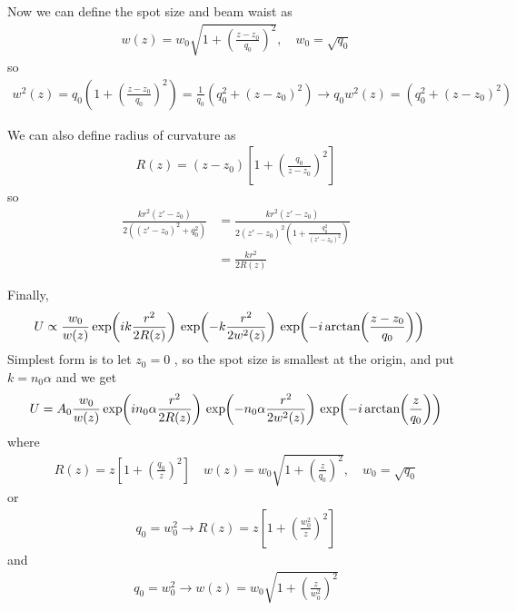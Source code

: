 Now we can define the spot size and beam waist as 
\begin{equation}
\begin{split}
   w(z) = w_0 \sqrt{1+\left(\frac{z-z_0}{q_0}\right)^2}, \quad  w_0 = \sqrt{q_0}
\end{split}
\end{equation}
so
\begin{equation}
\begin{split}
   w^2(z) = q_0\left(1+\left(\frac{z-z_0}{q_0}\right)^2\right) = \frac{1}{q_0} \left(q_0^2+(z-z_0)^2\right) \rightarrow q_0 w^2(z) = \left(q_0^2+(z-z_0)^2\right) 
\end{split}
\end{equation}


We can also define radius of curvature as 
\begin{equation}
\begin{split}
   R(z) = (z-z_0)\left[1 + \left(\frac{q_0}{ z-z_0}\right)^2\right]
\end{split}
\end{equation}
so
\begin{equation}
\begin{split}
  \frac{k r^2(z'-z_0)}{2 ((z'-z_0)^2 + q_0^2)} &= \frac{k r^2(z'-z_0)}{2 (z'-z_0)^2(1 + \frac{q_0^2}{(z'-z_0)^2})}\\
  &=\frac{k r^2}{2 R(z)}
\end{split}
\end{equation}

Finally,
\begin{equation}
\begin{split}
   U  &\propto \frac{w_0}{w(z)} \exp{i k \frac{r^2}{2 R(z)}} \exp{-k \frac{r^2}{2 w^2(z)}} \exp{-i \atan{ \frac{z - z_0}{q_0} } }
\end{split}
\end{equation}
Simplest form is to let $z_0 = 0$ , so the spot size is smallest at the origin, and put $k = n_0 \alpha$ and we get
\begin{equation}
\begin{split}
   U  = A_0\frac{w_0}{w(z)} \exp{in_0 \alpha\frac{r^2}{2 R(z)}} \exp{-n_0 \alpha\frac{r^2}{2w^2(z)}} \exp{-i \atan{ \frac{z}{q_0} } }
\end{split}
\end{equation}
where
\begin{equation}
\begin{split}
   R(z) = z\left[1 + \left(\frac{q_0}{z}\right)^2\right]\quad    w(z) = w_0 \sqrt{1+\left(\frac{z}{q_0}\right)^2} , \quad  w_0 = \sqrt{q_0}
\end{split}
\end{equation}
or 
\begin{equation}
\begin{split}
   q_0= w_0^2 \rightarrow R(z) = z\left[1 + \left(\frac{w_0^2}{z}\right)^2\right] 
\end{split}
\end{equation}
and
\begin{equation}
\begin{split}
   q_0= w_0^2 \rightarrow  w(z) = w_0 \sqrt{1+\left(\frac{z}{w_0^2}\right)^2}
\end{split}
\end{equation}


